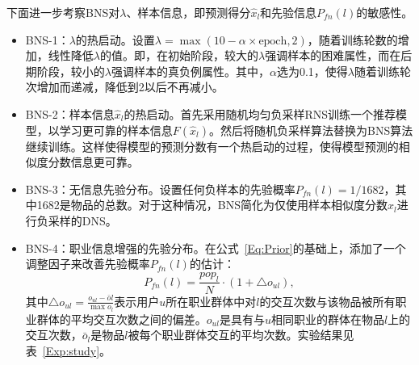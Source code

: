 下面进一步考察\textsf{BNS}对$\lambda$、样本信息，即预测得分$\hat{x}_l$和先验信息$P_{fn}(l)$的敏感性。
\begin{itemize}
	\item{BNS}-1：$\lambda$的热启动。设置$\lambda = \max(10-\alpha \times \text{epoch}, 2)$，随着训练轮数的增加，线性降低$\lambda$的值。即，在初始阶段，较大的$\lambda$强调样本的困难属性，而在后期阶段，较小的$\lambda$强调样本的真负例属性。其中，$\alpha$选为0.1，使得$\lambda$随着训练轮次增加而递减，降低到2以后不再减小。
	\item{BNS}-2：样本信息$\hat{x}_l$的热启动。首先采用随机均匀负采样RNS训练一个推荐模型，以学习更可靠的样本信息$F(\hat{x}_l)$。然后将随机负采样算法替换为BNS算法继续训练。这样使得模型的预测分数有一个热启动的过程，使得模型预测的相似度分数信息更可靠。
	\item{BNS}-3：无信息先验分布\cite{beye:book}。设置任何负样本的先验概率$P_{fn}(l) = 1/1682$，其中1682是物品的总数。对于这种情况，BNS简化为仅使用样本相似度分数$\hat{x}_l$进行负采样的DNS。
	\item{BNS}-4：职业信息增强的先验分布。在公式~\eqref{Eq:Prior}的基础上，添加了一个调整因子来改善先验概率$P_{fn}(l)$的估计：
	\[P_{fn}(l) = \frac{pop_l}{N} \cdot (1 + \triangle o_{ul}),\]
	其中$\triangle o_{ul} = \frac{o_{ul} - \bar{o}l}{\max{o}_{l}}$表示用户$u$所在职业群体中对$l$的交互次数与该物品被所有职业群体的平均交互次数之间的偏差。$o_{ul}$是具有与$u$相同职业的群体在物品$l$上的交互次数，$\bar{o}_l$是物品$l$被每个职业群体交互的平均次数。实验结果见表~\ref{Exp:study}。
\end{itemize}
